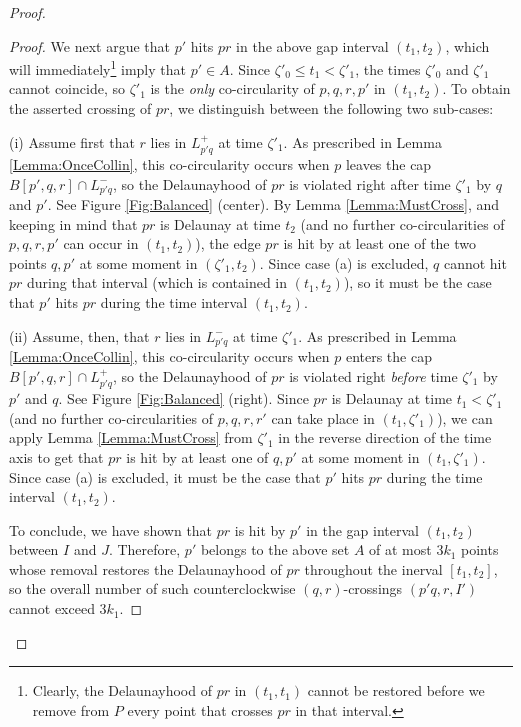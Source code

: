\documentclass[letter,11pt]{article}
\def \L{{L}}
\begin{document}
\begin{proof}
\begin{proof}
We next argue that $p'$ hits $pr$ in the above gap interval $(t_1,t_2)$, which will immediately\footnote{Clearly, the Delaunayhood of $pr$ in $(t_1,t_1)$ cannot be restored before we remove from $P$ every point that crosses $pr$ in that interval.} imply that $p'\in A$.
Since $\zeta'_0\leq t_1<\zeta'_1$, the times $\zeta'_0$ and $\zeta'_1$ cannot coincide, so $\zeta'_1$ is the {\it only} co-circularity of $p,q,r,p'$ in $(t_1,t_2)$. To obtain the asserted crossing of $pr$, we distinguish between the following two sub-cases:

\medskip
\noindent (i) Assume first that $r$ lies in $\L_{p'q}^+$ at time $\zeta'_1$. As prescribed in Lemma \ref{Lemma:OnceCollin}, this co-circularity occurs when $p$ leaves the cap $B[p',q,r]\cap \L_{p'q}^-$, so the Delaunayhood of $pr$ is violated right after time $\zeta'_1$ by $q$ and $p'$. See Figure \ref{Fig:Balanced} (center).
By Lemma \ref{Lemma:MustCross}, and keeping in mind that $pr$ is Delaunay at time $t_2$ (and no further co-circularities of $p,q,r,p'$ can occur in $(t_1,t_2)$), the edge $pr$ is hit by at least one of the two points $q,p'$ at some moment in $(\zeta'_1,t_2)$. 
Since case (a) is excluded, $q$ cannot hit $pr$ during that interval (which is contained in $(t_1,t_2)$), so it must be the case that $p'$ hits $pr$ during the time interval $(t_1,t_2)$. 

\smallskip
\noindent (ii) Assume, then, that $r$ lies in $\L_{p'q}^-$ at time $\zeta'_1$. As prescribed in Lemma \ref{Lemma:OnceCollin}, this co-circularity occurs when $p$ enters the cap $B[p',q,r]\cap \L_{p'q}^+$, so the Delaunayhood of $pr$ is violated right {\it before} time $\zeta'_1$ by $p'$ and $q$. See Figure \ref{Fig:Balanced} (right).
Since $pr$ is Delaunay at time $t_1<\zeta'_1$ (and no further co-circularities of $p,q,r,r'$ can take place in $(t_1,\zeta'_1)$), we can apply Lemma \ref{Lemma:MustCross} from $\zeta'_1$ in the reverse direction of the time axis to get that $pr$ is hit by at least one of $q,p'$ at some moment in $(t_1,\zeta'_1)$. Since case (a) is excluded, it must be the case that $p'$ hits $pr$ during the time interval $(t_1,t_2)$.

\smallskip
To conclude, we have shown that $pr$ is hit by $p'$ in the gap interval $(t_1,t_2)$ between $I$ and $J$.
Therefore, $p'$ belongs to the above set $A$ of at most $3k_1$ points whose removal restores the Delaunayhood of $pr$ throughout the inerval $[t_1,t_2]$, so the overall number of such counterclockwise $(q,r)$-crossings $(p'q,r,I')$ cannot exceed $3k_1$.


\end{proof}
\end{proof}
\end{document}
